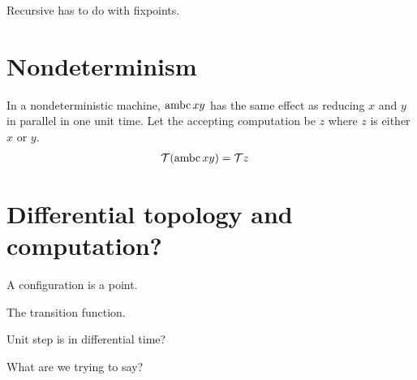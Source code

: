 Recursive has to do with fixpoints.

\section{Nondeterminism}

In a nondeterministic machine, $\operatorname{ambc} x y$
has the same effect as reducing $x$ and $y$ in parallel in one unit time.
Let the accepting computation be $z$ where $z$ is either $x$ or $y$.
\begin{align}
    \mathcal{T}(\operatorname{ambc} xy) &= \mathcal{T} z
\end{align}

\section{Differential topology and computation?}

A configuration is a point.

The transition function.

Unit step is in differential time?

What are we trying to say?
